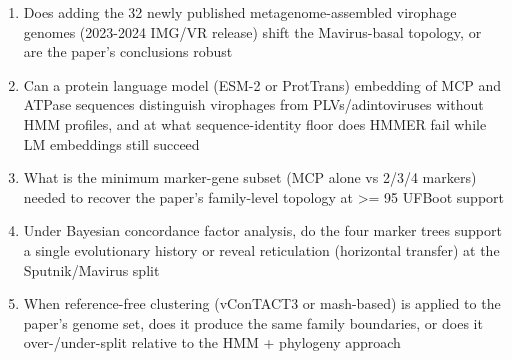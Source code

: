 \begin{enumerate}[leftmargin=1.6em,itemsep=0.2em,topsep=0.2em,label=Q\arabic*.]
\item Does adding the 32 newly published metagenome-assembled virophage genomes (2023-2024 IMG/VR release) shift the Mavirus-basal topology, or are the paper's conclusions robust
\item Can a protein language model (ESM-2 or ProtTrans) embedding of MCP and ATPase sequences distinguish virophages from PLVs/adintoviruses without HMM profiles, and at what sequence-identity floor does HMMER fail while LM embeddings still succeed
\item What is the minimum marker-gene subset (MCP alone vs 2/3/4 markers) needed to recover the paper's family-level topology at \textgreater{}= 95 UFBoot support
\item Under Bayesian concordance factor analysis, do the four marker trees support a single evolutionary history or reveal reticulation (horizontal transfer) at the Sputnik/Mavirus split
\item When reference-free clustering (vConTACT3 or mash-based) is applied to the paper's genome set, does it produce the same family boundaries, or does it over-/under-split relative to the HMM + phylogeny approach
\end{enumerate}

